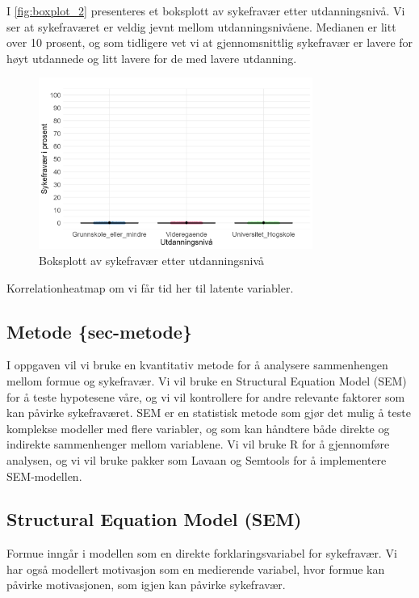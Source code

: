 \documentclass[
  12pt,
  a4paper,
  DIV=11,
  numbers=noendperiod]{scrartcl}
\begin{document}
I \autoref{fig:boxplot_2} presenteres et boksplott av sykefravær etter
utdanningsnivå. Vi ser at sykefraværet er veldig jevnt mellom
utdanningsnivåene. Medianen er litt over 10 prosent, og som tidligere
vet vi at gjennomsnittlig sykefravær er lavere for høyt utdannede og
litt lavere for de med lavere utdanning.

\begin{figure}[H]
\caption{Boksplott av sykefravær etter utdanningsnivå}
\label{fig:boxplot_2}
\centering
\includegraphics[width=0.8\textwidth]{dokumentobjekter/figurer/fig_7.png}
\end{figure}

Korrelationheatmap om vi får tid her til latente variabler.

\subsection{Metode \{sec-metode\}}\label{metode-sec-metode}

I oppgaven vil vi bruke en kvantitativ metode for å analysere
sammenhengen mellom formue og sykefravær. Vi vil bruke en Structural
Equation Model (SEM) for å teste hypotesene våre, og vi vil kontrollere
for andre relevante faktorer som kan påvirke sykefraværet. SEM er en
statistisk metode som gjør det mulig å teste komplekse modeller med
flere variabler, og som kan håndtere både direkte og indirekte
sammenhenger mellom variablene. Vi vil bruke R for å gjennomføre
analysen, og vi vil bruke pakker som Lavaan og Semtools for å
implementere SEM-modellen.

\subsection{Structural Equation Model
(SEM)}\label{structural-equation-model-sem}

Formue inngår i modellen som en direkte forklaringsvariabel for
sykefravær. Vi har også modellert motivasjon som en medierende variabel,
hvor formue kan påvirke motivasjonen, som igjen kan påvirke sykefravær.
\end{document}
